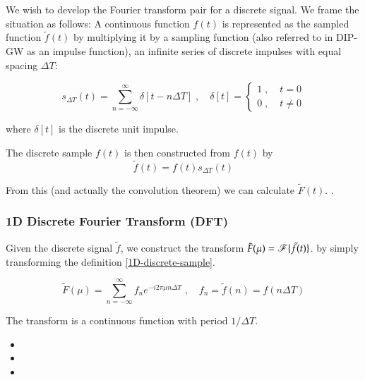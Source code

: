 	We wish to develop the Fourier transform pair for a discrete signal. We frame the situation
	as follows: A continuous function $f(t)$  is represented as the sampled function $\tilde{f}(t)$ by multiplying it by a sampling function (also referred to
	in DIP-GW as an impulse function), an infinite series of discrete impulses with equal spacing $\Delta T$:
	
	\begin{equation} \label{1D-sampling-function}
	s_{\Delta T}(t) = \sum_{n=-\infty}^{\infty} \delta[t - n\Delta T] \;,\quad
	\delta[t] = \begin{cases} 1 \;,\; & t=0 \\ 0 \;,\;& t \ne 0 \end{cases}
	\end{equation}
	
	where $\delta[t]$ is the discrete unit impulse.
	
	The discrete sample $f(t)$ is then constructed from $f(t)$ by
	\begin{equation} \label{1D-discrete-sample}
	\tilde{f}(t) = f(t) s_{\Delta T}(t)
	\end{equation}
	
	From this (and actually the convolution theorem) we can calculate $\tilde{F}(t)$. .
	
	\subsubsection{1D Discrete Fourier Transform (DFT)}
	
	Given the discrete signal $\tilde{f}$, we construct the transform
	$\tilde{F}(\mu) = \operatorname{\mathscr{F}}\{\tilde{f}(t)\}$. by simply transforming the definition \cref{1D-discrete-sample}.
	
	
	\begin{equation} \label{1D-DFT-transform}
	\tilde{F}(\mu) = \sum_{n=-\infty}^{\infty} f_n e^{-i 2\pi \mu n \Delta T} \;,\quad
		f_n = \tilde{f}(n) = f(n\Delta T)
	\end{equation}
	
	The transform is a continuous function with period $1 / \Delta T$. 
	
		\begin{itemize}
			\item {}
			\item {}
			\item {}
		\end{itemize}
		

